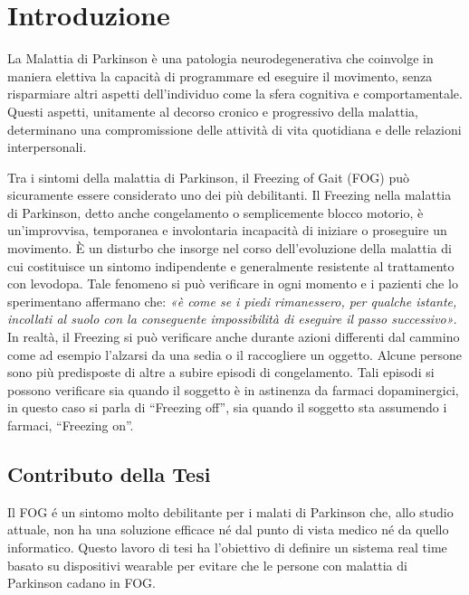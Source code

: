 


\chapter{Introduzione}\label{cap1:Introduzione}

La Malattia di Parkinson è una patologia neurodegenerativa che coinvolge in maniera elettiva la capacità di programmare ed eseguire il movimento, senza risparmiare altri aspetti dell’individuo come la sfera cognitiva e comportamentale. Questi aspetti, unitamente al decorso cronico e progressivo della malattia, determinano una compromissione delle attività di vita quotidiana e delle relazioni interpersonali.

Tra i sintomi della malattia di Parkinson, il Freezing of Gait (FOG) può sicuramente essere considerato uno dei più debilitanti. Il Freezing nella malattia di Parkinson, detto anche congelamento o semplicemente blocco motorio, è un’improvvisa, temporanea e involontaria incapacità di iniziare o proseguire un movimento. È un disturbo che insorge nel corso dell’evoluzione della malattia di cui costituisce un sintomo indipendente e generalmente resistente al trattamento con levodopa. Tale fenomeno si può verificare in ogni momento e i pazienti che lo sperimentano affermano che: \textit{«è come se i piedi rimanessero, per qualche istante, incollati al suolo con la conseguente impossibilità di eseguire il passo successivo»}. In realtà, il Freezing si può verificare anche durante azioni differenti dal cammino come ad esempio l’alzarsi da una sedia o il raccogliere un oggetto. Alcune persone sono più predisposte di altre a subire episodi di congelamento. Tali episodi si possono verificare sia quando il soggetto è in astinenza da farmaci dopaminergici, in questo caso si parla di “Freezing off”, sia quando il soggetto sta assumendo i farmaci, “Freezing on”. \\

\section{Contributo della Tesi}\label{cap1:Contributo della Tesi}
Il FOG é un sintomo molto debilitante per i malati di Parkinson che, allo studio attuale, non ha una soluzione efficace né dal punto di vista medico né da quello informatico. Questo lavoro di tesi ha l’obiettivo di definire un sistema real time basato su dispositivi wearable per evitare che le persone con malattia di Parkinson cadano in FOG.\\



